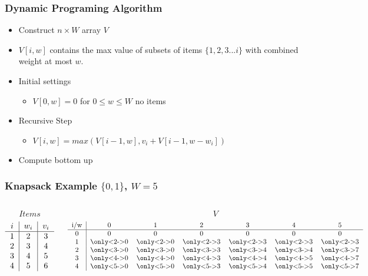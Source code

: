\documentclass{beamer}
\begin{document}
\begin{frame}
\frametitle{Dynamic Programing Algorithm}
\begin{itemize}
\item Construct $n \times W$ array $V$
\item $V[i,w]$ contains the max value of subsets of items $\{1,2,3...i\}$ with combined weight at most $w$.
\item Initial settings
    \begin{itemize}
    \item $V[0,w] = 0$ for $0 \leq w \leq W$ no items
    \end{itemize}
\item Recursive Step
    \begin{itemize}
    \item $V[i,w] = max(V[i-1,w], v_i + V[i-1, w-w_i])$
    \end{itemize}
\item Compute bottom up
\end{itemize}
\end{frame}
\begin{frame}
\frametitle{Knapsack Example $\{0,1\}$,  $W = 5$  }
\begin{columns}[c]
$$Items$$
\[
\begin{tabular}{c|c|c}
$i$&$w_i$&$v_i$ \\
\hline
1&2&3\\
2&3&4\\
3&4&5\\
4&5&6\\
\end{tabular}
\]

$$V$$
\[
\begin{tabular}{c|cccccc}
i/w&0&1&2&3&4&5\\
\hline
0&0&0&0&0&0&0\\
1&\only<2->{0}&\only<2->{0}&\only<2->{3}&\only<2->{3}&\only<2->{3}&\only<2->{3}\\
2&\only<3->{0}&\only<3->{0}&\only<3->{3}&\only<3->{4}&\only<3->{4}&\only<3->{7}\\
3&\only<4->{0}&\only<4->{0}&\only<4->{3}&\only<4->{4}&\only<4->{5}&\only<4->{7}\\
4&\only<5->{0}&\only<5->{0}&\only<5->{3}&\only<5->{4}&\only<5->{5}&\only<5->{7}\\

\end{tabular}
\]

\end{columns}

\end{frame}
\end{document}
